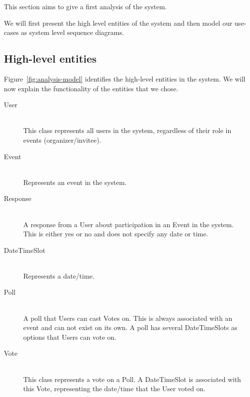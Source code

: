 This section aims to give a first analysis of the system.

We will first present the high level entities of the system and then model our use-cases as system level sequence diagrams.

\subsection{High-level entities}
	\label{sec:analysisdiagram}
	Figure~\ref{fig:analysis-model} identifies the high-level entities in the system. We will now explain the functionality of the entities that we chose.

	\begin{description}
		\item[User] \hfill \\
			This class represents all users in the system, regardless of their role in events (organizer/invitee).
		\item[Event] \hfill \\
			Represents an event in the system.
		\item[Response] \hfill \\
			A response from a User about participation in an Event in the system. This is either yes or no and does not specify any date or time.
		\item[DateTimeSlot] \hfill \\
			Represents a date/time.
		\item[Poll] \hfill \\
			A poll that Users can cast Votes on. This is always associated with an event and can not exist on its own. A poll has several DateTimeSlots as options that Users can vote on.
		\item[Vote] \hfill \\
			This class represents a vote on a Poll. A DateTimeSlot is associated with this Vote, representing the date/time that the User voted on.
			
	\end{description}
	

